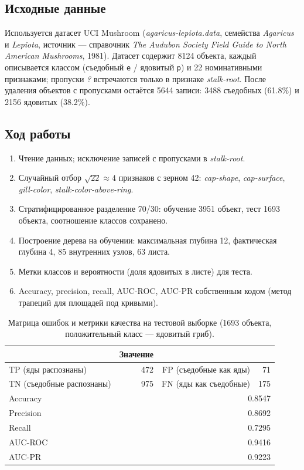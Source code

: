 \documentclass[12pt,a4paper]{article}
\begin{document}
\subsection{Исходные данные}
Используется датасет UCI Mushroom (\emph{agaricus-lepiota.data}, семейства \textit{Agaricus} и \textit{Lepiota}, источник --- справочник \emph{The Audubon Society Field Guide to North American Mushrooms}, 1981). Датасет содержит 8124 объекта, каждый описывается классом (съедобный \texttt{e} / ядовитый \texttt{p}) и 22 номинативными признаками; пропуски \emph{?} встречаются только в признаке \emph{stalk-root}. После удаления объектов с пропусками остаётся 5644 записи: 3488 съедобных (61.8\%) и 2156 ядовитых (38.2\%).

\subsection{Ход работы}
\begin{enumerate}
\item Чтение данных; исключение записей с пропусками в \emph{stalk-root}.
\item Случайный отбор $\sqrt{22} \approx 4$ признаков с зерном 42: \emph{cap-shape}, \emph{cap-surface}, \emph{gill-color}, \emph{stalk-color-above-ring}.
\item Стратифицированное разделение 70/30: обучение 3951 объект, тест 1693 объекта, соотношение классов сохранено.
\item Построение дерева на обучении: максимальная глубина 12, фактическая глубина 4, 85 внутренних узлов, 63 листа.
\item Метки классов и вероятности (доля ядовитых в листе) для теста.
\item Accuracy, precision, recall, AUC-ROC, AUC-PR собственным кодом (метод трапеций для площадей под кривыми).
\end{enumerate}

\begin{table}[H]
\centering
\caption{Матрица ошибок и метрики качества на тестовой выборке (1693 объекта, положительный класс --- ядовитый гриб).}
\label{tab:lab5_metrics}
\begin{tabular}{lrrr}
\toprule
 & Значение & & \\
\midrule
TP (яды распознаны) & 472 & FP (съедобные как яды) & 71 \\
TN (съедобные распознаны) & 975 & FN (яды как съедобные) & 175 \\
\midrule
Accuracy & \multicolumn{3}{r}{0.8547} \\
Precision & \multicolumn{3}{r}{0.8692} \\
Recall & \multicolumn{3}{r}{0.7295} \\
AUC-ROC & \multicolumn{3}{r}{0.9416} \\
AUC-PR & \multicolumn{3}{r}{0.9223} \\
\bottomrule
\end{tabular}
\end{table}
\end{document}
